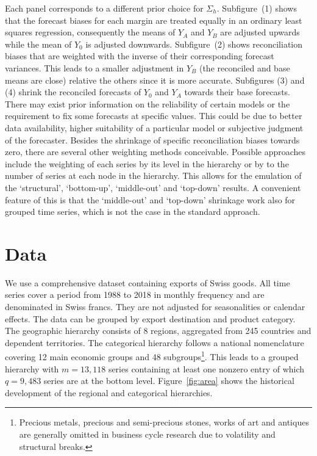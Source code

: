 \documentclass[a4paper,fleqn,11pt]{article}
\begin{document}
Each panel corresponds to a different prior choice for $\Sigma_h$. Subfigure~(1) shows that the forecast biases for each margin are treated equally in an ordinary least squares regression, consequently the means of $Y_A$ and $Y_B$ are adjusted upwards while the mean of $Y_0$ is adjusted downwards. Subfigure~(2) shows reconciliation biases that are weighted with the inverse of their corresponding forecast variances. This leads to a smaller adjustment in $Y_B$ (the reconciled and base means are close) relative the others since it is more accurate. Subfigures (3) and (4) shrink the reconciled forecasts of $Y_0$ and $Y_A$ towards their base forecasts. There may exist prior information on the reliability of certain models or the requirement to fix some forecasts at specific values. This could be due to better data availability, higher suitability of a particular model or subjective judgment of the forecaster. Besides the shrinkage of specific reconciliation biases towards zero, there are several other weighting methods conceivable. Possible approaches include the weighting of each series by its level in the hierarchy or by to the number of series at each node in the hierarchy. This allows for the emulation of the `structural', `bottom-up', `middle-out' and `top-down' results. A convenient feature of this is that the `middle-out' and `top-down' shrinkage work also for grouped time series, which is not the case in the standard approach.


\section{Data}\label{sec:datadesc}

We use a comprehensive dataset containing exports of Swiss goods. All time series cover a period from 1988 to 2018 in monthly frequency and are denominated in Swiss francs. They are not adjusted for seasonalities or calendar effects. The data can be grouped by export destination and product category. The geographic hierarchy consists of 8 regions, aggregated from 245 countries and dependent territories. The categorical hierarchy follows a national nomenclature covering 12 main economic groups and 48 subgroups\footnote{Precious metals, precious and semi-precious stones, works of art and antiques are generally omitted in business cycle research due to volatility and structural breaks.}. This leads to a grouped hierarchy with $m = 13,118$ series containing at least one nonzero entry of which $q = 9,483$ series are at the bottom level. Figure~\ref{fig:area} shows the historical development of the regional and categorical hierarchies.
\end{document}
